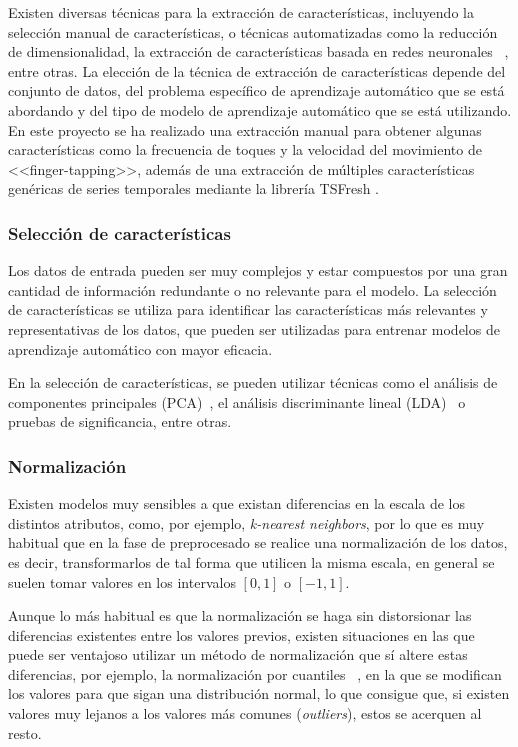 Existen diversas técnicas para la extracción de características, incluyendo la
selección manual de características, o técnicas automatizadas como la reducción
de dimensionalidad, la extracción de características basada en redes neuronales
~\cite{intrator1991feature}, entre otras. La elección de la técnica de
extracción de características depende del conjunto de datos, del problema
específico de aprendizaje automático que se está abordando y del tipo de modelo
de aprendizaje automático que se está utilizando. En este proyecto se ha
realizado una extracción manual para obtener algunas características como la
frecuencia de toques y la velocidad del movimiento de <<finger-tapping>>, además
de una extracción de múltiples características genéricas de series temporales
mediante la librería TSFresh \cite{christ2018time}.

\subsubsection{Selección de características}

Los datos de entrada pueden ser muy complejos y estar compuestos por una gran
cantidad de información redundante o no relevante para el modelo. La selección
de características se utiliza para identificar  las características más
relevantes y representativas de los datos, que pueden ser utilizadas para
entrenar modelos de aprendizaje automático con mayor eficacia.

En la selección de características, se pueden utilizar técnicas como el análisis
de componentes principales (PCA)~\cite{mackiewicz1993principal}, el análisis
discriminante lineal (LDA)~\cite{xanthopoulos2013linear} o pruebas de
significancia, entre otras.

\subsubsection{Normalización}

Existen modelos muy sensibles a que existan diferencias en la escala de los
distintos atributos, como, por ejemplo, \textit{k-nearest neighbors}, por lo que
es muy habitual que en la fase de preprocesado se realice una normalización de
los datos, es decir, transformarlos de tal forma que utilicen la misma escala,
en general se suelen tomar valores en los intervalos $[0, 1]$ o $[-1, 1]$.

Aunque lo más habitual es que la normalización se haga sin distorsionar las
diferencias existentes entre los valores previos, existen situaciones en las que
puede ser ventajoso utilizar un método de normalización que sí altere estas
diferencias, por ejemplo, la normalización por cuantiles
~\cite{enwiki:1138433182}, en la que se modifican los valores para que sigan una
distribución normal, lo que consigue que, si existen valores muy lejanos a los
valores más comunes (\textit{outliers}), estos se acerquen al resto. 

